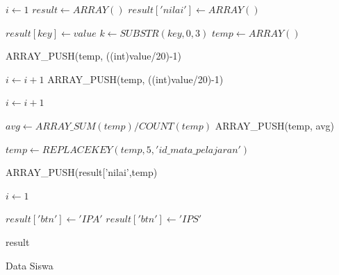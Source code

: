 \begin{enumerate}
        \begin{algorithm}[H]
          \begin{algorithmic}[1]
                \State $i \gets 1$
                \State $result \gets ARRAY()$
                \State $result['nilai'] \gets ARRAY()$
                
                        \State $result[key] \gets value$
                    \Else
                            \State $k \gets SUBSTR(key, 0, 3)$
                            \State $temp \gets ARRAY()$
                            
                            \State ARRAY\_PUSH(temp, ((int)value/20)-1) 
                            
                            \State $i \gets i+1$
                        \Else
                            \State ARRAY\_PUSH(temp, ((int)value/20)-1) 
                            
                            \State $i \gets i+1$
                            
                                \State $avg \gets ARRAY\_SUM(temp)/COUNT(temp)$
                                \State ARRAY\_PUSH(temp, avg)
                                
                                \State $temp \gets REPLACEKEY(temp, 5, 'id\_mata\_pelajaran')$
                                
                                \State ARRAY\_PUSH(result['nilai',temp)
                                
                                \State $i \gets 1$
                            \EndIf
                        \EndIf
                    \EndIf
                \EndFor
                
                    \State $result['btn'] \gets 'IPA'$
                    \State $result['btn'] \gets 'IPS'$
                \EndIf
                
                \State \Return result
            \EndProcedure
            \end{algorithmic} 
            \caption{Data Siswa}
            \label{alg:data siswa controller}
        \end{algorithm}
    

\end{enumerate}
